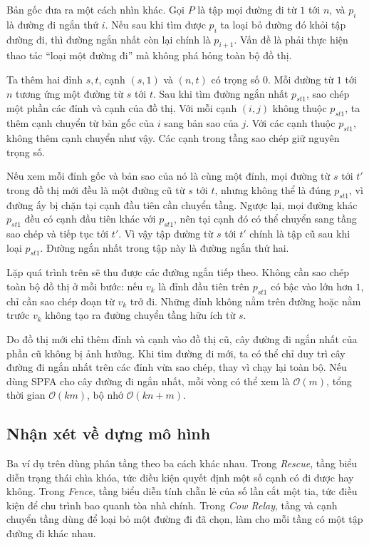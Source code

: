 \documentclass[11pt]{article}
\newcommand{\Oh}{\mathcal{O}}
\begin{document}
Bản gốc đưa ra một cách nhìn khác. Gọi \(P\) là tập mọi đường đi từ \(1\) tới
\(n\), và \(p_i\) là đường đi ngắn thứ \(i\). Nếu sau khi tìm được \(p_i\) ta
loại bỏ đường đó khỏi tập đường đi, thì đường ngắn nhất còn lại chính là
\(p_{i+1}\). Vấn đề là phải thực hiện thao tác ``loại một đường đi'' mà không
phá hỏng toàn bộ đồ thị.

Ta thêm hai đỉnh \(s,t\), cạnh \((s,1)\) và \((n,t)\) có trọng số \(0\). Mỗi
đường từ \(1\) tới \(n\) tương ứng một đường từ \(s\) tới \(t\). Sau khi tìm
đường ngắn nhất \(p_{st1}\), sao chép một phần các đỉnh và cạnh của đồ thị.
Với mỗi cạnh \((i,j)\) không thuộc \(p_{st1}\), ta thêm cạnh chuyển từ bản gốc
của \(i\) sang bản sao của \(j\). Với các cạnh thuộc \(p_{st1}\), không thêm
cạnh chuyển như vậy. Các cạnh trong tầng sao chép giữ nguyên trọng số.

Nếu xem mỗi đỉnh gốc và bản sao của nó là cùng một đỉnh, mọi đường từ \(s\)
tới \(t'\) trong đồ thị mới đều là một đường cũ từ \(s\) tới \(t\), nhưng
không thể là đúng \(p_{st1}\), vì đường ấy bị chặn tại cạnh đầu tiên cần
chuyển tầng. Ngược lại, mọi đường khác \(p_{st1}\) đều có cạnh đầu tiên khác
với \(p_{st1}\), nên tại cạnh đó có thể chuyển sang tầng sao chép và tiếp tục
tới \(t'\). Vì vậy tập đường từ \(s\) tới \(t'\) chính là tập cũ sau khi loại
\(p_{st1}\). Đường ngắn nhất trong tập này là đường ngắn thứ hai.

Lặp quá trình trên sẽ thu được các đường ngắn tiếp theo. Không cần sao chép
toàn bộ đồ thị ở mỗi bước: nếu \(v_k\) là đỉnh đầu tiên trên \(p_{st1}\) có
bậc vào lớn hơn \(1\), chỉ cần sao chép đoạn từ \(v_k\) trở đi. Những đỉnh
không nằm trên đường hoặc nằm trước \(v_k\) không tạo ra đường chuyển tầng hữu
ích từ \(s\).

Do đồ thị mới chỉ thêm đỉnh và cạnh vào đồ thị cũ, cây đường đi ngắn nhất của
phần cũ không bị ảnh hưởng. Khi tìm đường đi mới, ta có thể chỉ duy trì cây
đường đi ngắn nhất trên các đỉnh vừa sao chép, thay vì chạy lại toàn bộ. Nếu
dùng SPFA cho cây đường đi ngắn nhất, mỗi vòng có thể xem là \(\Oh(m)\), tổng
thời gian \(\Oh(km)\), bộ nhớ \(\Oh(kn+m)\).

\subsection{Nhận xét về dựng mô hình}

Ba ví dụ trên dùng phân tầng theo ba cách khác nhau. Trong \textit{Rescue},
tầng biểu diễn trạng thái chìa khóa, tức điều kiện quyết định một số cạnh có
đi được hay không. Trong \textit{Fence}, tầng biểu diễn tính chẵn lẻ của số
lần cắt một tia, tức điều kiện để chu trình bao quanh tòa nhà chính. Trong
\textit{Cow Relay}, tầng và cạnh chuyển tầng dùng để loại bỏ một đường đi đã
chọn, làm cho mỗi tầng có một tập đường đi khác nhau.
\end{document}

